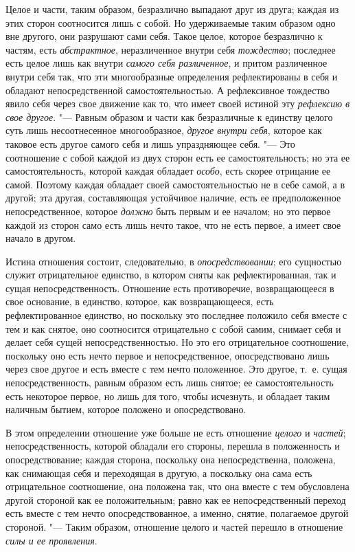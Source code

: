 Целое и части, таким образом, безразлично выпадают друг из друга; каждая из
этих сторон соотносится лишь с собой. Но удерживаемые таким образом одно
вне другого, они разрушают сами себя. Такое целое, которое безразлично к
частям, есть {\em абстрактное}, неразличенное внутри
себя {\em тождество}; последнее есть целое лишь как
внутри {\em самого себя различенное}, и притом
различенное внутри себя так, что эти многообразные определения
рефлектированы в себя и обладают непосредственной самостоятельностью. А
рефлексивное тождество явило себя через свое движение как то, что имеет
своей истиной эту {\em рефлексию в свое другое}. "---
Равным образом и части как безразличные к единству целого суть лишь
несоотнесенное многообразное, {\em другое внутри себя},
которое как таковое есть другое самого себя и лишь упраздняющее себя. "--- Это
соотношение с собой каждой из двух сторон есть ее самостоятельность; но эта
ее самостоятельность, которой каждая обладает
{\em особо}, есть скорее отрицание ее самой. Поэтому
каждая обладает своей самостоятельностью не в себе самой, а в другой; эта
другая, составляющая устойчивое наличие, есть ее предположенное
непосредственное, которое {\em должно} быть первым и ее
началом; но это первое каждой из сторон само есть лишь нечто такое, что не
есть первое, а имеет свое начало в другом.

Истина отношения состоит, следовательно, в
{\em опосредствовании}; его сущностью служит
отрицательное единство, в котором сняты как рефлектированная, так и сущая
непосредственность. Отношение есть противоречие, возвращающееся в свое
основание, в единство, которое, как возвращающееся, есть рефлектированное
единство, но поскольку это последнее положило себя вместе с тем и как
снятое, оно соотносится отрицательно с собой самим, снимает себя и делает
себя сущей непосредственностью. Но это его отрицательное соотношение,
поскольку оно есть нечто первое и непосредственное, опосредствовано лишь
через свое другое и есть вместе с тем нечто положенное. Это другое, т.~е.
сущая непосредственность, равным образом есть лишь снятое; ее
самостоятельность есть некоторое первое, но лишь для того, чтобы исчезнуть,
и обладает таким наличным бытием, которое положено и опосредствовано.

В этом определении отношение уже больше не есть отношение
{\em целого} и {\em частей};
непосредственность, которой обладали его стороны, перешла в положенность и
опосредствование; каждая сторона, поскольку она непосредственна, положена,
как снимающая себя и переходящая в другую, а поскольку она сама есть
отрицательное соотношение, она положена так, что она вместе с тем
обусловлена другой стороной как ее положительным; равно как ее
непосредственный переход есть вместе с тем нечто опосредствованное, а
именно, снятие, полагаемое другой стороной. "--- Таким образом, отношение
целого и частей перешло в отношение {\em силы и ее
проявления}.


